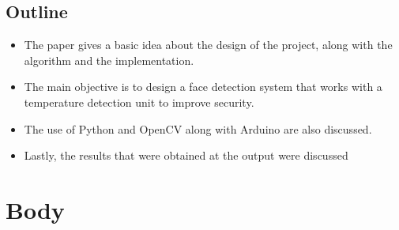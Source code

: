 \documentclass[conference]{IEEEtran}
\begin{document}
	\subsection{Outline}
	\begin{itemize}
		\item The paper gives a basic idea about the design of the project, along with the
		algorithm and the implementation.
		\item The main objective is to design a face detection system
		that works with a temperature detection unit to improve security. 
		\item The use of Python and OpenCV along
		with Arduino are also discussed.
		\item Lastly, the results that were obtained at the output were discussed
	\end{itemize}
	
	\section{Body}
\end{document}
